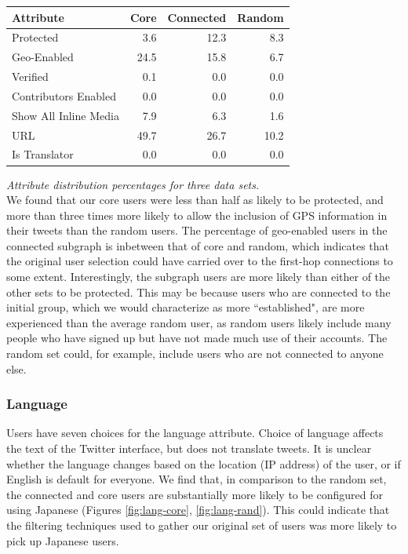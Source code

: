 \begin{center}
\begin{tabular}{| l | r | r | r |}
\hline
\textbf{Attribute} & \textbf{Core} & \textbf{Connected} & \textbf{Random} \\ \hline
Protected & 3.6 & 12.3 & 8.3 \\ \hline
Geo-Enabled & 24.5 & 15.8 & 6.7 \\ \hline
Verified & 0.1 & 0.0 & 0.0 \\ \hline
Contributors Enabled & 0.0 & 0.0 & 0.0 \\ \hline
Show All Inline Media & 7.9 & 6.3 & 1.6 \\ \hline
URL & 49.7 & 26.7 & 10.2 \\ \hline
Is Translator & 0.0 & 0.0 & 0.0 \\ \hline
\end{tabular}
\end{center}
\textit{Attribute distribution percentages for three data sets.}\\

We found that our core users were less than half as likely to be protected, and more than three times more likely to allow the inclusion of GPS information in their tweets than the random users.  The percentage of geo-enabled users in the connected subgraph is inbetween that of core and random, which indicates that the original user selection could have carried over to the first-hop connections to some extent.  Interestingly, the subgraph users are more likely than either of the other sets to be protected.  This may be because users who are connected to the initial group, which we would characterize as more ``established", are more experienced than the average random user, as random users likely include many people who have signed up but have not made much use of their accounts.  The random set could, for example, include users who are not connected to anyone else.

\subsubsection{Language}

Users have seven choices for the language attribute.  Choice of language affects the text of the Twitter interface, but does not translate tweets.  It is unclear whether the language changes based on the location (IP address) of the user, or if English is default for everyone.  We find that, in comparison to the random set, the connected and core users are substantially more likely to be configured for using Japanese (Figures \ref{fig:lang-core}, \ref{fig:lang-rand}).  This could indicate that the filtering techniques used to gather our original set of users was more likely to pick up Japanese users.


